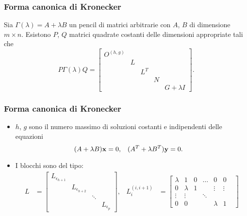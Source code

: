 \begin{frame}
	\frametitle{Forma canonica di Kronecker}
	\begin{theorem}
		Sia \(\Gamma(\lambda) = A + \lambda B\) un pencil di matrici arbitrarie con
		$A$, $B$ di dimensione \(m \times n\). Esistono $P$, $Q$
		matrici quadrate costanti delle dimensioni appropriate tali che
		\[
			P\Gamma(\lambda)Q = \begin{bmatrix}
				O^{(h, g)} \\
				& L \\
				&& L^T \\
				&&& N \\
				&&&& G+\lambda I
			\end{bmatrix}.
		\]
	\end{theorem}
\end{frame}


\begin{frame}
	\frametitle{Forma canonica di Kronecker}
	\begin{itemize}
		\item $h$, $g$ sono il numero massimo di soluzioni costanti e indipendenti delle
		equazioni
		\begin{align*}
			(A + \lambda B)\vb{x} &= 0, & (A^T + \lambda B^T)\vb{y} &= 0.
		\end{align*}
		\item {} I blocchi sono del tipo:
		\begin{align*}
			L &= \left[\begin{smallmatrix}
				L_{\epsilon_{h+1}} \\
				& L_{\epsilon_{h+2}} \\
				& & \ddots \\
				& & & L_{\epsilon_{p}}
			\end{smallmatrix}\right], &
			L_{i}^{(i, i+1)} &= \left[\begin{smallmatrix}
				\lambda        &      1     &       0      &     \ldots       &    0       &    0   \\
				0              & \lambda    &       1      &                  & \vdots     & \vdots \\
				\vdots         & \vdots     &     & \ddots    &      &            &        \\
				0              &      0     &              &                  & \lambda    &    1   
			\end{smallmatrix}\right]
		\end{align*}
	\end{itemize}
\end{frame}


